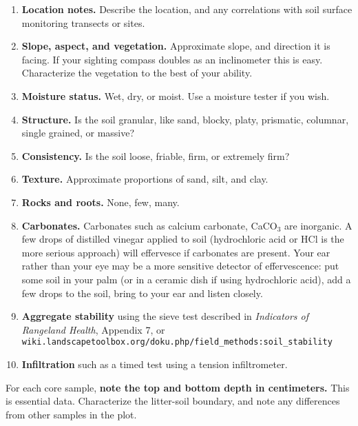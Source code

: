 \documentclass[11pt,letterpaper,oneside,onecolumn]{memoir}
\begin{document}
\begin{enumerate}

\item \textbf{Location notes.} Describe the location, and any correlations with soil surface monitoring transects or sites.

\item \textbf{Slope, aspect, and vegetation.} Approximate slope, and direction it is facing. If your sighting compass doubles as an inclinometer this is easy. Characterize the vegetation to the best of your ability.

\item \textbf{Moisture status.} Wet, dry, or moist. Use a moisture tester if you wish.

\item \textbf{Structure.} Is the soil granular, like sand, blocky, platy, prismatic, columnar, single grained, or massive?

\item \textbf{Consistency.} Is the soil loose, friable, firm, or extremely firm?

\item \textbf{Texture.} Approximate proportions of sand, silt, and clay.

\item \textbf{Rocks and roots.} None, few, many.

\item \textbf{Carbonates.} Carbonates such as calcium carbonate, CaCO$_3$ are inorganic. A few drops of distilled vinegar applied to soil (hydrochloric acid or HCl is the more serious approach) will effervesce if carbonates are present. Your ear rather than your eye may be a more sensitive detector of effervescence: put some soil in your palm (or in a ceramic dish if using hydrochloric acid), add a few drops to the soil, bring to your ear and listen closely.

\item \textbf{Aggregate stability} using the sieve test described in \textit{Indicators of Rangeland Health}, Appendix 7, or\\ \texttt{wiki.landscapetoolbox.org/doku.php/field\_methods:soil\_stability}

\item \textbf{Infiltration} such as a timed test using a tension infiltrometer.

\end{enumerate}

For each core sample, \textbf{note the top and bottom depth in centimeters.} This is essential data. Characterize the litter-soil boundary, and note any differences from other samples in the plot.
\end{document}
